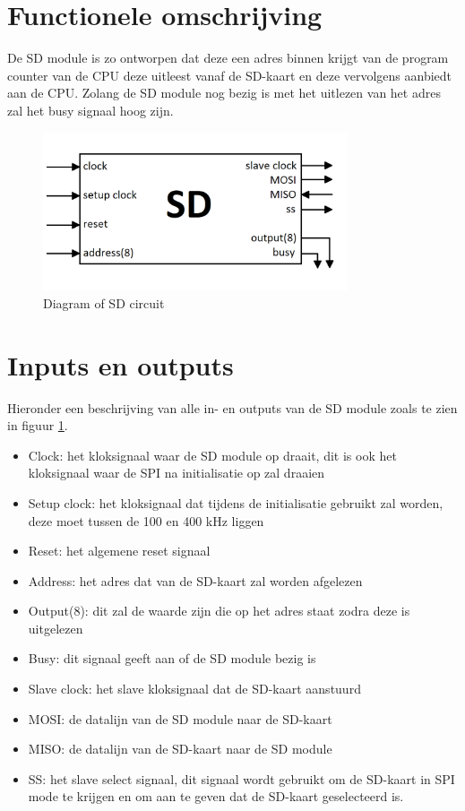 \documentclass[oneside,dutch]{tudelft-report}
\begin{document}
\section{Functionele omschrijving}
De SD module is zo ontworpen dat deze een adres binnen krijgt van de program counter van de CPU deze uitleest vanaf de SD-kaart en deze vervolgens aanbiedt aan de CPU. Zolang de SD module nog bezig is met het uitlezen van het adres zal het busy signaal hoog zijn.

\begin{figure}[H]
\center
\includegraphics[width=9cm]{./sd_diagram}
\caption{Diagram of SD circuit}
\label{sd-diagram}
\end{figure}

\newpage

\section{Inputs en outputs}
Hieronder een beschrijving van alle in- en outputs van de SD module zoals te zien in figuur \ref{sd-diagram}.

\begin{itemize}
\item Clock: het kloksignaal waar de SD module op draait, dit is ook het kloksignaal waar de SPI na initialisatie op zal draaien
\item Setup clock: het kloksignaal dat tijdens de initialisatie gebruikt zal worden, deze moet tussen de 100 en 400 kHz liggen
\item Reset: het algemene reset signaal 
\item Address: het adres dat van de SD-kaart zal worden afgelezen
\item Output(8): dit zal de waarde zijn die op het adres staat zodra deze is uitgelezen
\item Busy: dit signaal geeft aan of de SD module bezig is
\item Slave clock: het slave kloksignaal dat de SD-kaart aanstuurd
\item MOSI: de datalijn van de SD module naar de SD-kaart
\item MISO: de datalijn van de SD-kaart naar de SD module
\item SS: het slave select signaal, dit signaal wordt gebruikt om de SD-kaart in SPI mode te krijgen en om aan te geven dat de SD-kaart geselecteerd is.
\end{itemize}
\end{document}
